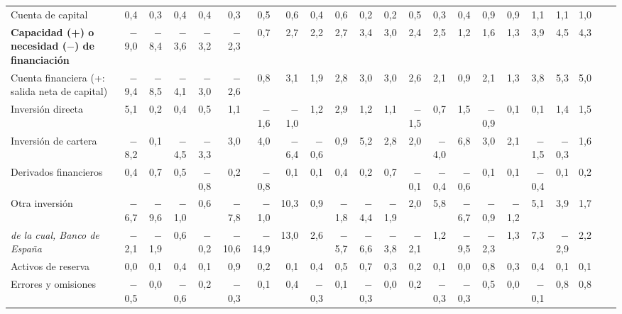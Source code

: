\begin{tabular}{@{}>{\raggedright\arraybackslash}p{\dimexpr\anchoetq-\tabcolsep\relax}*{21}{N}@{}}
Cuenta de capital & 0{,}4 & 0{,}3 & 0{,}4 & 0{,}4 & 0{,}3 & 0{,}5 & 0{,}6 & 0{,}4 & 0{,}6 & 0{,}2 & 0{,}2 & 0{,}5 & 0{,}3 & 0{,}4 & 0{,}9 & 0{,}9 & 1{,}1 & 1{,}1 & 1{,}0 &  &  \\
\textbf{Capacidad (+) o necesidad ($-$) de financiación} & $-$9{,}0 & $-$8{,}4 & $-$3{,}6 & $-$3{,}2 & $-$2{,}3 & 0{,}7 & 2{,}7 & 2{,}2 & 2{,}7 & 3{,}4 & 3{,}0 & 2{,}4 & 2{,}5 & 1{,}2 & 1{,}6 & 1{,}3 & 3{,}9 & 4{,}5 & 4{,}3 &  &  \\
Cuenta financiera (+: salida neta de capital) & $-$9{,}4 & $-$8{,}5 & $-$4{,}1 & $-$3{,}0 & $-$2{,}6 & 0{,}8 & 3{,}1 & 1{,}9 & 2{,}8 & 3{,}0 & 3{,}0 & 2{,}6 & 2{,}1 & 0{,}9 & 2{,}1 & 1{,}3 & 3{,}8 & 5{,}3 & 5{,}0 &  &  \\
\hspace*{0.8em}Inversión directa & 5{,}1 & 0{,}2 & 0{,}4 & 0{,}5 & 1{,}1 & $-$1{,}6 & $-$1{,}0 & 1{,}2 & 2{,}9 & 1{,}2 & 1{,}1 & $-$1{,}5 & 0{,}7 & 1{,}5 & $-$0{,}9 & 0{,}1 & 0{,}1 & 1{,}4 & 1{,}5 &  &  \\
\hspace*{0.8em}Inversión de cartera & $-$8{,}2 & 0{,}1 & $-$4{,}5 & $-$3{,}3 & 3{,}0 & 4{,}0 & $-$6{,}4 & $-$0{,}6 & 0{,}9 & 5{,}2 & 2{,}8 & 2{,}0 & $-$4{,}0 & 6{,}8 & 3{,}0 & 2{,}1 & $-$1{,}5 & $-$0{,}3 & 1{,}6 &  &  \\
\hspace*{0.8em}Derivados financieros & 0{,}4 & 0{,}7 & 0{,}5 & $-$0{,}8 & 0{,}2 & $-$0{,}8 & 0{,}1 & 0{,}1 & 0{,}4 & 0{,}2 & 0{,}7 & $-$0{,}1 & $-$0{,}4 & $-$0{,}6 & 0{,}1 & 0{,}1 & $-$0{,}4 & 0{,}1 & 0{,}2 &  &  \\
\hspace*{0.8em}Otra inversión & $-$6{,}7 & $-$9{,}6 & $-$1{,}0 & 0{,}6 & $-$7{,}8 & $-$1{,}0 & 10{,}3 & 0{,}9 & $-$1{,}8 & $-$4{,}4 & $-$1{,}9 & 2{,}0 & 5{,}8 & $-$6{,}7 & $-$0{,}9 & $-$1{,}2 & 5{,}1 & 3{,}9 & 1{,}7 &  &  \\
\hspace*{1.6em}\textit{de la cual, Banco de España} & $-$2{,}1 & $-$1{,}9 & 0{,}6 & $-$0{,}2 & $-$10{,}6 & $-$14{,}9 & 13{,}0 & 2{,}6 & $-$5{,}7 & $-$6{,}6 & $-$3{,}8 & $-$2{,}1 & 1{,}2 & $-$9{,}5 & $-$2{,}3 & 1{,}3 & 7{,}3 & $-$2{,}9 & 2{,}2 &  &  \\
\hspace*{0.8em}Activos de reserva & 0{,}0 & 0{,}1 & 0{,}4 & 0{,}1 & 0{,}9 & 0{,}2 & 0{,}1 & 0{,}4 & 0{,}5 & 0{,}7 & 0{,}3 & 0{,}2 & 0{,}1 & 0{,}0 & 0{,}8 & 0{,}3 & 0{,}4 & 0{,}1 & 0{,}1 &  &  \\
Errores y omisiones & $-$0{,}5 & 0{,}0 & $-$0{,}6 & 0{,}2 & $-$0{,}3 & 0{,}1 & 0{,}4 & $-$0{,}3 & 0{,}1 & $-$0{,}3 & 0{,}0 & 0{,}2 & $-$0{,}3 & $-$0{,}3 & 0{,}5 & 0{,}0 & $-$0{,}1 & 0{,}8 & 0{,}8 &  &  \\

\end{tabular}
